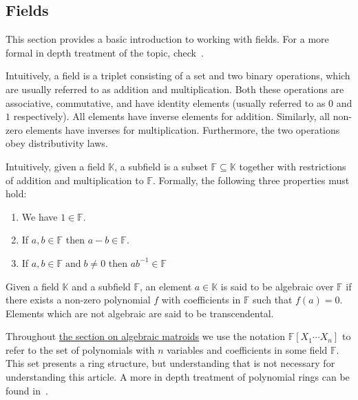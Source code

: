 \subsection{Fields}\label{sec:appendix-fields}

This section provides a basic introduction to working with fields. For a more formal in depth treatment of the topic, check~\cite{milne2022}.

\begin{defn}[Fields]
  Intuitively, a field is a triplet consisting of a set and two binary operations, which are usually referred to as addition and multiplication. Both these operations are associative, commutative, and have identity elements (usually referred to as $0$ and $1$ respectively). All elements have inverse elements for addition. Similarly, all non-zero elements have inverses for multiplication. Furthermore, the two operations obey distributivity laws.
\end{defn}

\begin{defn}[Subfields]
  Intuitively, given a field $\mathbb{K}$, a subfield is a subset $\mathbb{F} \subseteq \mathbb{K}$ together with restrictions of addition and multiplication to $\mathbb{F}$. Formally, the following three properties must hold:
  \begin{enumerate}
    \item We have $1 \in \mathbb{F}$.
    \item If $a, b \in \mathbb{F} $ then $ a - b \in \mathbb{F}$.
    \item If $a, b \in \mathbb{F} \;\text{and}\; b \neq 0$ then $ a b ^{-1}  \in \mathbb{F}$
  \end{enumerate}
\end{defn}

\begin{defn}
  Given a field $\mathbb{K}$ and a subfield $\mathbb{F}$, an element $a \in \mathbb{K}$ is said to be algebraic over $\mathbb{F}$ if there exists a non-zero polynomial $f$ with coefficients in $\mathbb{F}$ such that $f(a) = 0$. Elements which are not algebraic are said to be transcendental.
\end{defn}


Throughout \hyperref[sec:algebraic-matroids]{the section on algebraic matroids} we use the notation $\mathbb{F}[X _1 \cdots X_n]$ to refer to the set of polynomials with $n$ variables and coefficients in some field $\mathbb{F}$. This set presents a ring structure, but understanding that is not necessary for understanding this article. A more in depth treatment of polynomial rings can be found in~\cite{milne2022}.


